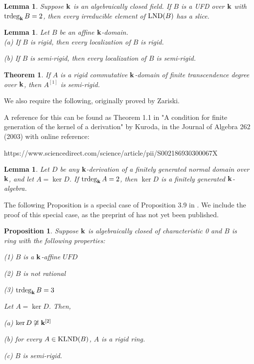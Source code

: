 \documentclass[12pt]{amsart}
\theoremstyle{plain}
\newcommand{\red}{\color{red}}
\newtheorem{theorem}[subsection]{Theorem}
\newtheorem{proposition}[subsection]{Proposition}
\newtheorem{lemma}[subsection]{Lemma}
\theoremstyle{definition}
\newcommand{\trdeg}{	\operatorname{{\rm trdeg}}}
\newcommand{\bk}{{\ensuremath{\rm \bf k}}}
\newcommand{\lnd}{\operatorname{{\rm LND}}}
\newcommand{\klnd}{\operatorname{{\rm KLND}}}
\newcommand{\isom}{\cong}
\begin{document}
\begin{lemma}\label{FV2-2.10}
	Suppose $\bk$ is an algebraically closed field. If $B$ is a UFD over $\bk$ with $\trdeg_\bk B = 2$, then every irreducible element of $\lnd(B)$ has a slice. 
\end{lemma}

\begin{lemma} \label{rigidLocalization}
	Let $B$ be an affine $\bk$-domain. 
	\\
	
	(a) If $B$ is rigid, then every localization of $B$ is rigid. 
	
	(b) If $B$ is semi-rigid, then every localization of $B$ is semi-rigid. 
\end{lemma}

\begin{theorem} \label{semirigidityTheorem}
	If $A$ is a rigid commutative $\bk$-domain of finite transcendence degree over $\bk$, then $A^{[1]}$ is semi-rigid.
\end{theorem}

We also require the following, originally proved by Zariski. {\red A reference for this can be found as Theorem 1.1 in "A condition for finite generation of the kernel of a derivation" by Kuroda, in the Journal of Algebra 262 (2003) with online reference:

https://www.sciencedirect.com/science/article/pii/S002186930300067X
}

\begin{lemma}\label{fgkerneldim2}
	Let $D$ be any $\bk$-derivation of a finitely generated normal domain over $\bk$, and let $A = \ker D$. If $\trdeg_\bk A = 2$, then $\ker D$ is a finitely generated $\bk$-algebra.  
\end{lemma}

The following Proposition is a special case of Proposition 3.9 in \cite{lndsStructure}. We include the proof of this special case, as the preprint of \cite{lndsStructure} has not yet been published. 

\begin{proposition}\label{trdeg3UFDnotRat}
	Suppose $\bk$ is algebraically closed of characteristic 0 and $B$ is ring with the following properties:
	
	(1) $B$ is a $\bk$-affine $UFD$
	
	(2) $B$ is not rational
	
	(3) $\trdeg_\bk B = 3$
	
	Let $A = \ker D$. Then,
	
	(a) $\ker D \not\isom \bk^{[2]}$
	
	(b) for every $A \in \klnd(B)$, $A$ is a rigid ring.
	
	(c) $B$ is semi-rigid. 
	
\end{proposition}
\end{document}
